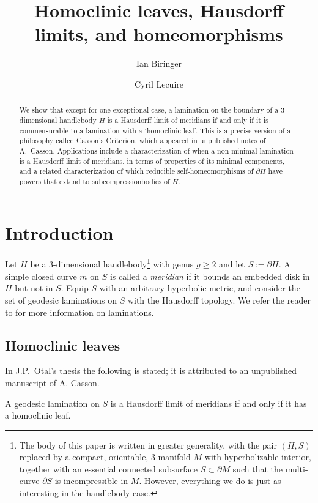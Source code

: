 \documentclass[12pt]{amsart}
\title{Homoclinic leaves, Hausdorff limits, and homeomorphisms}
\author{Ian Biringer}
\author{Cyril Lecuire}
\theoremstyle{definition}
\theoremstyle{remark}
\begin{document}
\begin{abstract}
We show that except for one exceptional case, a lamination on the boundary of a $3$-dimensional handlebody $H$ is a Hausdorff limit of meridians if and only if it is commensurable to a lamination with a `homoclinic leaf'. This is a precise version of a philosophy called Casson's Criterion, which appeared in unpublished notes of A.\ Casson. Applications include a characterization of when a non-minimal lamination is a Hausdorff limit of meridians, in terms of properties of its minimal components, and a related characterization of which reducible self-homeomorphisms of $\partial H$ have powers that extend to subcompressionbodies of $H$. \end{abstract}

\maketitle


\section{Introduction}

Let $H$ be a $3$-dimensional handlebody\footnote{The body of this paper is written in greater generality, with the pair $(H,S)$ replaced by a compact, orientable, $3$-manifold $M$ with hyperbolizable interior, together with an essential connected subsurface $S\subset \partial M$ such that the multi-curve $\partial S$ is incompressible in $M$. However, everything we do is just as interesting in the handlebody case.} with genus $g \geq 2$ and let $S:=\partial H$. A simple closed curve $m $ on $S$ is called a \emph {meridian} if it bounds an embedded disk in $H$ but not in $S$. Equip $S$ with an arbitrary hyperbolic metric, and consider the set of geodesic laminations on $S$ with the Hausdorff topology. We refer the reader to \cite{Bleilerautomorphisms} for more information on laminations.


\subsection{Homoclinic leaves} In J.P.\ Otal's thesis \cite{Otalcourants} the following is stated; it is  attributed to an unpublished manuscript of A. Casson. 

\begin{philosophy}\label{ccr}
	A geodesic lamination on $S$ is a Hausdorff limit of meridians if and only if it has a homoclinic leaf.
\end{philosophy}
\end{document}

